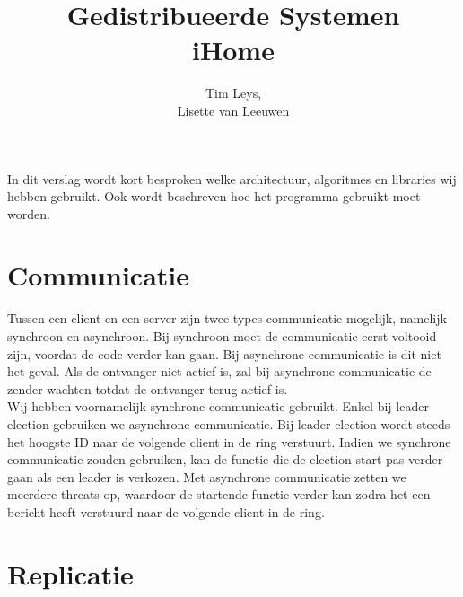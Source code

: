 \documentclass[a4paper]{article}
\title{ %
	Gedistribueerde Systemen \\
	\large iHome
	}
\author{ %
	Tim Leys, \\
	Lisette van Leeuwen \\
	}
\begin{document}
	\maketitle
	
	In dit verslag wordt kort besproken welke architectuur, algoritmes en libraries wij hebben gebruikt. Ook wordt beschreven hoe het programma gebruikt moet worden. 
	
	\section{Communicatie}
		Tussen een client en een server zijn twee types communicatie mogelijk, namelijk synchroon en asynchroon. Bij synchroon moet de communicatie eerst voltooid zijn, voordat de code verder kan gaan. Bij asynchrone communicatie is dit niet het geval. Als de ontvanger niet actief is, zal bij asynchrone communicatie de zender wachten totdat de ontvanger terug actief is. \\
		Wij hebben voornamelijk synchrone communicatie gebruikt. Enkel bij leader election gebruiken we asynchrone communicatie. Bij leader election wordt steeds het hoogste ID naar de volgende client in de ring verstuurt. Indien we synchrone communicatie zouden gebruiken, kan de functie die de election start pas verder gaan als een leader is verkozen. Met asynchrone communicatie zetten we meerdere threats op, waardoor de startende functie verder kan zodra het een bericht heeft verstuurd naar de volgende client in de ring. 
		
	\section{Replicatie}
		
	
\end{document}
